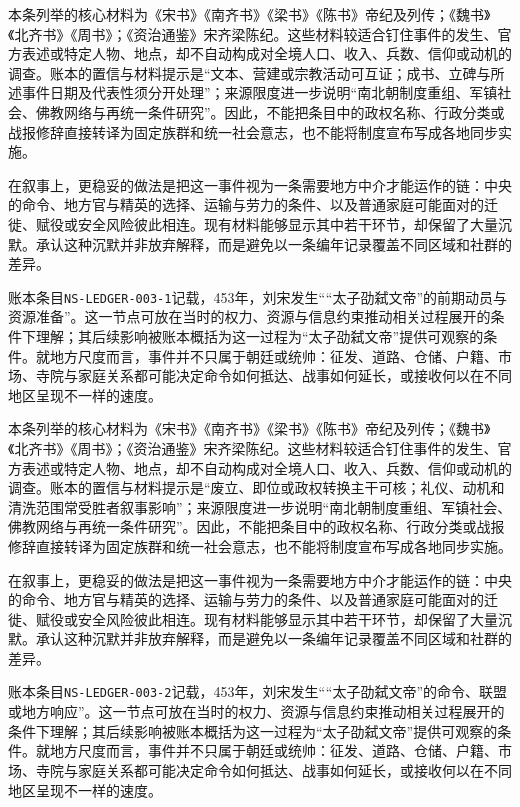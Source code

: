 本条列举的核心材料为《宋书》《南齐书》《梁书》《陈书》帝纪及列传；《魏书》《北齐书》《周书》；《资治通鉴》宋齐梁陈纪。这些材料较适合钉住事件的发生、官方表述或特定人物、地点，却不自动构成对全境人口、收入、兵数、信仰或动机的调查。账本的置信与材料提示是“文本、营建或宗教活动可互证；成书、立碑与所述事件日期及代表性须分开处理”；来源限度进一步说明“南北朝制度重组、军镇社会、佛教网络与再统一条件研究”。因此，不能把条目中的政权名称、行政分类或战报修辞直接转译为固定族群和统一社会意志，也不能将制度宣布写成各地同步实施。

在叙事上，更稳妥的做法是把这一事件视为一条需要地方中介才能运作的链：中央的命令、地方官与精英的选择、运输与劳力的条件、以及普通家庭可能面对的迁徙、赋役或安全风险彼此相连。现有材料能够显示其中若干环节，却保留了大量沉默。承认这种沉默并非放弃解释，而是避免以一条编年记录覆盖不同区域和社群的差异。

账本条目\texttt{NS-LEDGER-003-1}记载，453年，刘宋发生““太子劭弑文帝”的前期动员与资源准备”。这一节点可放在当时的权力、资源与信息约束推动相关过程展开的条件下理解；其后续影响被账本概括为这一过程为“太子劭弑文帝”提供可观察的条件。就地方尺度而言，事件并不只属于朝廷或统帅：征发、道路、仓储、户籍、市场、寺院与家庭关系都可能决定命令如何抵达、战事如何延长，或接收何以在不同地区呈现不一样的速度。

本条列举的核心材料为《宋书》《南齐书》《梁书》《陈书》帝纪及列传；《魏书》《北齐书》《周书》；《资治通鉴》宋齐梁陈纪。这些材料较适合钉住事件的发生、官方表述或特定人物、地点，却不自动构成对全境人口、收入、兵数、信仰或动机的调查。账本的置信与材料提示是“废立、即位或政权转换主干可核；礼仪、动机和清洗范围常受胜者叙事影响”；来源限度进一步说明“南北朝制度重组、军镇社会、佛教网络与再统一条件研究”。因此，不能把条目中的政权名称、行政分类或战报修辞直接转译为固定族群和统一社会意志，也不能将制度宣布写成各地同步实施。

在叙事上，更稳妥的做法是把这一事件视为一条需要地方中介才能运作的链：中央的命令、地方官与精英的选择、运输与劳力的条件、以及普通家庭可能面对的迁徙、赋役或安全风险彼此相连。现有材料能够显示其中若干环节，却保留了大量沉默。承认这种沉默并非放弃解释，而是避免以一条编年记录覆盖不同区域和社群的差异。

账本条目\texttt{NS-LEDGER-003-2}记载，453年，刘宋发生““太子劭弑文帝”的命令、联盟或地方响应”。这一节点可放在当时的权力、资源与信息约束推动相关过程展开的条件下理解；其后续影响被账本概括为这一过程为“太子劭弑文帝”提供可观察的条件。就地方尺度而言，事件并不只属于朝廷或统帅：征发、道路、仓储、户籍、市场、寺院与家庭关系都可能决定命令如何抵达、战事如何延长，或接收何以在不同地区呈现不一样的速度。


